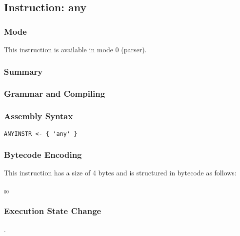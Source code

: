 \subsection{Instruction: any}

\subsubsection{Mode}
This instruction is available in mode 0 (parser).
\subsubsection{Summary}


\subsubsection{Grammar and Compiling}


\subsubsection{Assembly Syntax}

\begin{myquote}
\begin{verbatim}
ANYINSTR <- { 'any' }
\end{verbatim}
\end{myquote}

\subsubsection{Bytecode Encoding}

This instruction has a size of 4 bytes and is structured in bytecode as follows:

$_{00}$\ 

\subsubsection{Execution State Change}

.


